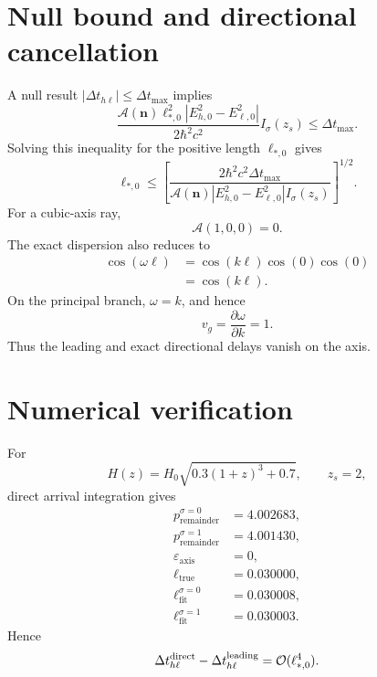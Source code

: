 \section{Null bound and directional cancellation}
A null result \(|\Delta t_{h\ell}|\le\Delta t_{\max}\) implies
\begin{equation}
\frac{
\mathcal A(\bm n)\ell_{*,0}^2
|E_{h,0}^2-E_{\ell,0}^2|
}{2\hbar^2c^2}
I_\sigma(z_s)
\le\Delta t_{\max}.
\end{equation}
Solving this inequality for the positive length \(\ell_{*,0}\) gives
\begin{equation}
\boxed{
\ell_{*,0}
\le
\left[
\frac{
2\hbar^2c^2\Delta t_{\max}
}{
\mathcal A(\bm n)|E_{h,0}^2-E_{\ell,0}^2|
I_\sigma(z_s)
}
\right]^{1/2}.
}
\end{equation}
For a cubic-axis ray,
\begin{equation}
\mathcal A(1,0,0)=0.
\end{equation}
The exact dispersion also reduces to
\begin{align}
\cos(\omega\ell)
&=\cos(k\ell)\cos(0)\cos(0)\\
&=\cos(k\ell).
\end{align}
On the principal branch, \(\omega=k\), and hence
\begin{equation}
v_g=\frac{\partial\omega}{\partial k}=1.
\end{equation}
Thus the leading and exact directional delays vanish on the axis.

\section{Numerical verification}
For
\begin{equation}
H(z)=H_0
\sqrt{0.3(1+z)^3+0.7},
\qquad
z_s=2,
\end{equation}
direct arrival integration gives
\begin{align}
p_{\mathrm{remainder}}^{\sigma=0}
&=4.002683,\\
p_{\mathrm{remainder}}^{\sigma=1}
&=4.001430,\\
\varepsilon_{\mathrm{axis}}
&=0,\\
\ell_{\mathrm{true}}&=0.030000,\\
\ell_{\mathrm{fit}}^{\sigma=0}&=0.030008,\\
\ell_{\mathrm{fit}}^{\sigma=1}&=0.030003.
\end{align}
Hence
\begin{equation}
\Delta t_{h\ell}^{\mathrm{direct}}
-\Delta t_{h\ell}^{\mathrm{leading}}
=\mathcal O(\ell_{*,0}^4).
\end{equation}

